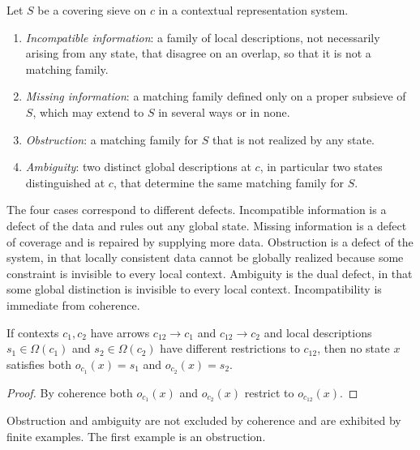 \begin{definition}\label{def:failmodes}
Let $S$ be a covering sieve on $c$ in a contextual representation system.
\begin{enumerate}[label=(F\arabic*)]
\item \emph{Incompatible information}: a family of local descriptions, not necessarily arising from any state, that disagree on an overlap, so that it is not a matching family.
\item \emph{Missing information}: a matching family defined only on a proper subsieve of $S$, which may extend to $S$ in several ways or in none.
\item \emph{Obstruction}: a matching family for $S$ that is not realized by any state.
\item \emph{Ambiguity}: two distinct global descriptions at $c$, in particular two states distinguished at $c$, that determine the same matching family for $S$.
\end{enumerate}
\end{definition}

The four cases correspond to different defects. Incompatible information is a defect of the data and rules out any global state. Missing information is a defect of coverage and is repaired by supplying more data. Obstruction is a defect of the system, in that locally consistent data cannot be globally realized because some constraint is invisible to every local context. Ambiguity is the dual defect, in that some global distinction is invisible to every local context. Incompatibility is immediate from coherence.

\begin{proposition}\label{prop:disagree}
If contexts $c_1,c_2$ have arrows $c_{12}\to c_1$ and $c_{12}\to c_2$ and local descriptions $s_1\in\Omega(c_1)$ and $s_2\in\Omega(c_2)$ have different restrictions to $c_{12}$, then no state $x$ satisfies both $o_{c_1}(x)=s_1$ and $o_{c_2}(x)=s_2$.
\end{proposition}
\begin{proof}
By coherence both $o_{c_1}(x)$ and $o_{c_2}(x)$ restrict to $o_{c_{12}}(x)$.
\end{proof}

Obstruction and ambiguity are not excluded by coherence and are exhibited by finite examples. The first example is an obstruction.

